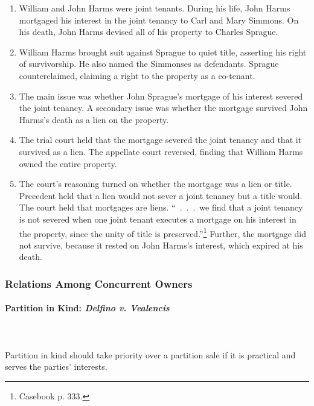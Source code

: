 \begin{enumerate}
    \item William and John Harms were joint tenants. During his life, John 
    Harms mortgaged his interest in the joint tenancy to Carl and Mary 
    Simmons. On his death, John Harms devised all of his property to Charles 
    Sprague.
    \item William Harms brought suit against Sprague to quiet title, asserting 
    his right of survivorship. He also named the Simmonses as defendants. 
    Sprague counterclaimed, claiming a right to the property as a co-tenant.
    \item The main issue was whether John Sprague's mortgage of his interest 
    severed the joint tenancy. A secondary issue was whether the mortgage 
    survived John Harms's death as a lien on the property.
    \item The trial court held that the mortgage severed the joint tenancy and 
    that it survived as a lien. The appellate court reversed, finding that 
    William Harms owned the entire property.
    \item The court's reasoning turned on whether the mortgage was a lien or 
    title. Precedent held that a lien would not sever a joint tenancy but a 
    title would. The court held that mortgages are liens. ``~.~.~.~we find 
    that a joint tenancy is not severed when one joint tenant executes a 
    mortgage on his interest in the property, since the unity of title is 
    preserved.''\footnote{Casebook p. 333.} Further, the mortgage did not 
    survive, because it rested on John Harms's interest, which expired at his 
    death.
\end{enumerate}

\subsubsection{Relations Among Concurrent Owners}

\paragraph{Partition in Kind: \emph{Delfino v. Vealencis}}
~\\\\
Partition in kind should take priority over a partition sale if it is 
practical and serves the parties' interests.

